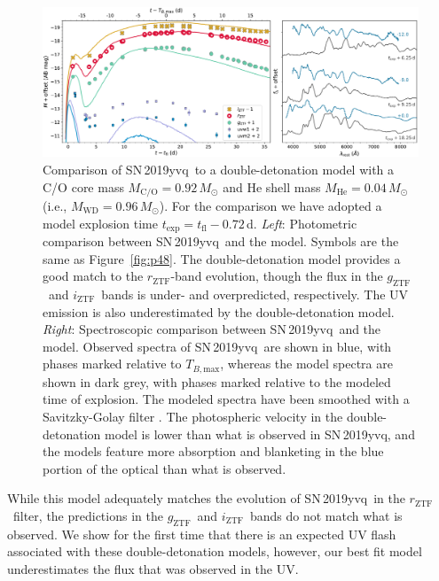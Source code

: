 \documentclass[twocolumn]{aastex63}
\newcommand{\rztf}{$r_\mathrm{ZTF}$}
\newcommand{\gztf}{$g_\mathrm{ZTF}$}
\newcommand{\iztf}{$i_\mathrm{ZTF}$}
\newcommand{\tbmax}{$T_{B,\mathrm{max}}$}
\newcommand{\sn}{SN\,2019yvq}
\begin{document}
\begin{figure}
    \centering
    \includegraphics[width=\textwidth]{./figures/double_det.pdf}
    \caption{Comparison of \sn\ to a double-detonation model with a C/O core
    mass $M_\mathrm{C/O} = 0.92\,M_\odot$ and He shell mass $M_\mathrm{He} =
    0.04\,M_\odot$ (i.e., $M_\mathrm{WD} = 0.96\,M_\odot$). For the comparison
    we have adopted a model explosion time $t_\mathrm{exp} = t_\mathrm{fl} -
    0.72$\,d. \textit{Left}: Photometric comparison between \sn\ and the
    model. Symbols are the same as Figure~\ref{fig:p48}. The double-detonation
    model provides a good match to the \rztf-band evolution, though the flux
    in the \gztf\ and \iztf\ bands is under- and overpredicted, respectively.
    The UV emission is also underestimated by the double-detonation model.
    \textit{Right}: Spectroscopic comparison between \sn\ and the model.
    Observed spectra of \sn\ are shown in blue, with phases marked relative to
    \tbmax, whereas the model spectra are shown in dark grey, with phases
    marked relative to the modeled time of explosion. The modeled spectra
    have been smoothed with a Savitzky-Golay filter \citep{Savitzky64}. The
    photospheric velocity in the double-detonation model is lower than what is
    observed in \sn, and the models feature more absorption and blanketing in
    the blue portion of the optical than what is observed. }
    \label{fig:double_det}
\end{figure}

While this model adequately matches the evolution of \sn\ in the \rztf\
filter, the predictions in the \gztf\ and \iztf\ bands do not match what is
observed. We show for the first time that there is an expected UV flash
associated with these double-detonation models, however, our best fit model
underestimates the flux that was observed in the UV.
\end{document}
